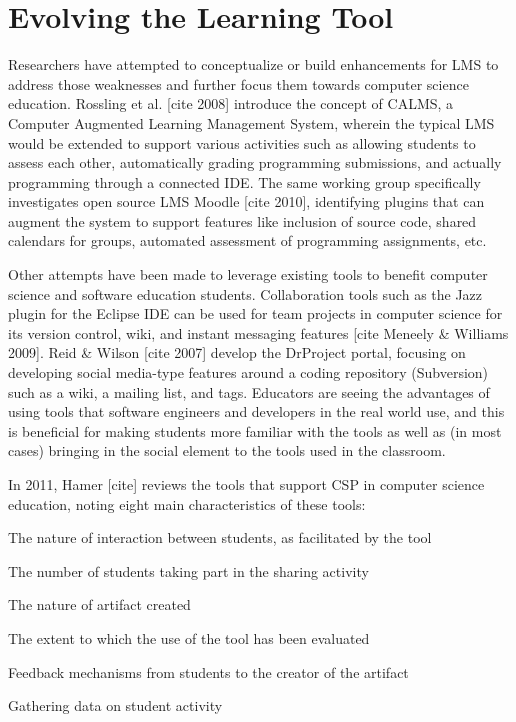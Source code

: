 \section{Evolving the Learning Tool}

Researchers have attempted to conceptualize or build enhancements for LMS to address those weaknesses and further focus them towards computer science education. Rossling et al. [cite 2008] introduce the concept of CALMS, a Computer Augmented Learning Management System, wherein the typical LMS would be extended to support various activities such as allowing students to assess each other, automatically grading programming submissions, and actually programming through a connected IDE. The same working group specifically investigates open source LMS Moodle [cite 2010], identifying plugins that can augment the system to support features like inclusion of source code, shared calendars for groups, automated assessment of programming assignments, etc.

Other attempts have been made to leverage existing tools to benefit computer science and software education students. Collaboration tools such as the Jazz plugin for the Eclipse IDE can be used for team projects in computer science for its version control, wiki, and instant messaging features [cite Meneely \& Williams 2009]. Reid \& Wilson [cite 2007] develop the DrProject portal, focusing on developing social media-type features around a coding repository (Subversion) such as a wiki, a mailing list, and tags. Educators are seeing the advantages of using tools that software engineers and developers in the real world use, and this is beneficial for making students more familiar with the tools as well as (in most cases) bringing in the social element to the tools used in the classroom.

In 2011, Hamer [cite] reviews the tools that support CSP in computer science education, noting eight main characteristics of these tools:

The nature of interaction between students, as facilitated by the tool

The number of students taking part in the sharing activity

The nature of artifact created

The extent to which the use of the tool has been evaluated

Feedback mechanisms from students to the creator of the artifact

Gathering data on student activity


